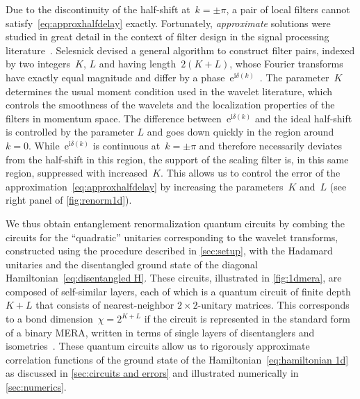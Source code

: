 \documentclass[aps,pra,reprint,superscriptaddress,floatfix,amsmath,amssymb,amsfonts]{revtex4-1}
\newcommand*{\rmi}{\mathrm{i}}
\newcommand*{\rme}{\mathrm{e}}
\begin{document}
Due to the discontinuity of the half-shift at~$k=\pm\pi$, a pair of local filters cannot satisfy~\eqref{eq:approxhalfdelay} exactly.
Fortunately, \emph{approximate} solutions were studied in great detail in the context of filter design in the signal processing literature~\cite{kingsbury1999image,selesnick2002design}.
Selesnick devised a general algorithm to construct filter pairs, indexed by two integers~$K$, $L$ and having length~$2(K+L)$, whose Fourier transforms have exactly equal magnitude and differ by a phase~$\rme^{\rmi \delta(k)}$~\cite{selesnick2002design}.
The parameter~$K$ determines the usual moment condition used in the wavelet literature, which controls the smoothness of the wavelets and the localization properties of the filters in momentum space.
The difference between~$\rme^{\rmi \delta(k)}$ and the ideal half-shift is controlled by the parameter $L$ and goes down quickly in the region around~$k=0$.
While~$\rme^{\rmi \delta(k)}$ is continuous at~$k=\pm \pi$ and therefore necessarily deviates from the half-shift in this region, the support of the scaling filter is, in this same region, suppressed with increased~$K$.
This allows us to control the error of the approximation~\eqref{eq:approxhalfdelay} by increasing the parameters~$K$ and~$L$ (see right panel of \cref{fig:renorm1d}).

We thus obtain entanglement renormalization quantum circuits by combing the circuits for the ``quadratic'' unitaries corresponding to the wavelet transforms, constructed using the procedure described in \cref{sec:setup}, with the Hadamard unitaries and the disentangled ground state of the diagonal Hamiltonian~\eqref{eq:disentangled H}.
These circuits, illustrated in \cref{fig:1dmera}, are composed of self-similar layers, each of which is a quantum circuit of finite depth $K+L$ that consists of nearest-neighbor $2\times 2$-unitary matrices.
This corresponds to a bond dimension~$\chi=2^{K+L}$ if the circuit is represented in the standard form of a binary MERA, written in terms of single layers of disentanglers and isometries~\cite{vidal2007entanglement,vidal2008mera}.
These quantum circuits allow us to rigorously approximate correlation functions of the ground state of the Hamiltonian~\eqref{eq:hamiltonian 1d} as discussed in \cref{sec:circuits and errors} and illustrated numerically in \cref{sec:numerics}.
\end{document}
